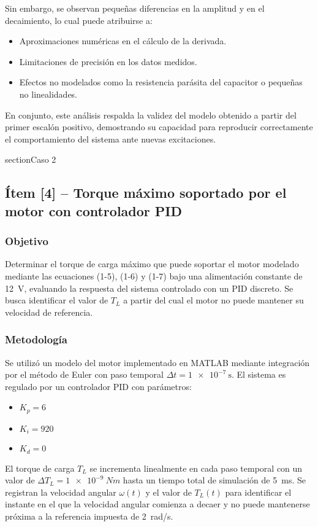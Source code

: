\documentclass{article}
\begin{document}
Sin embargo, se observan pequeñas diferencias en la amplitud y en el decaimiento, lo cual puede atribuirse a:
\begin{itemize}
    \item Aproximaciones numéricas en el cálculo de la derivada.
    \item Limitaciones de precisión en los datos medidos.
    \item Efectos no modelados como la resistencia parásita del capacitor o pequeñas no linealidades.
\end{itemize}

En conjunto, este análisis respalda la validez del modelo obtenido a partir del primer escalón positivo, demostrando su capacidad para reproducir correctamente el comportamiento del sistema ante nuevas excitaciones.

section{Caso 2}
\subsection*{Ítem [4] -- Torque máximo soportado por el motor con controlador PID}

\subsubsection*{Objetivo}
Determinar el torque de carga máximo que puede soportar el motor modelado mediante las ecuaciones (1-5), (1-6) y (1-7) bajo una alimentación constante de \SI{12}{\volt}, evaluando la respuesta del sistema controlado con un PID discreto. Se busca identificar el valor de $T_L$ a partir del cual el motor no puede mantener su velocidad de referencia.

\subsubsection*{Metodología}
Se utilizó un modelo del motor implementado en MATLAB mediante integración por el método de Euler con paso temporal $\Delta t = \SI{1e-7}{\second}$. El sistema es regulado por un controlador PID con parámetros:

\begin{itemize}
  \item $K_p = 6$
  \item $K_i = 920$
  \item $K_d = 0$
\end{itemize}

El torque de carga $T_L$ se incrementa linealmente en cada paso temporal con un valor de $\Delta T_L = \SI{1e-9}{Nm}$ hasta un tiempo total de simulación de \SI{5}{\milli\second}. Se registran la velocidad angular $\omega(t)$ y el valor de $T_L(t)$ para identificar el instante en el que la velocidad angular comienza a decaer y no puede mantenerse próxima a la referencia impuesta de \SI{2}{rad/s}.
\end{document}
